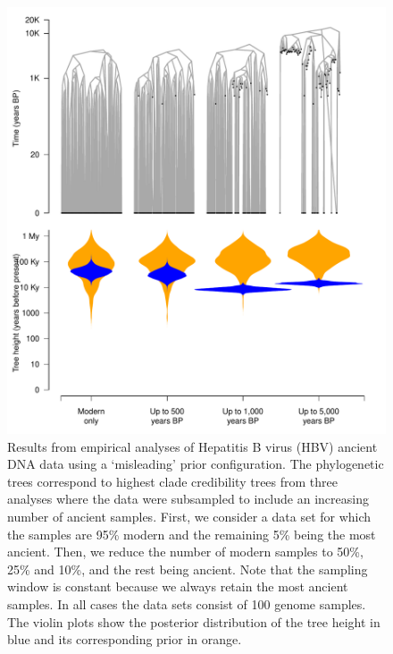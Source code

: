 \documentclass[11pt]{article}
\begin{document}
\begin{figure}[H]
    \begin{center}
        \includegraphics[scale=0.7, angle=0]{empirical_results_depth_misleading_prior_tree_height.pdf}
        \caption{Results from empirical analyses of Hepatitis B virus (HBV) ancient DNA data using a `misleading' prior configuration. The phylogenetic trees correspond to highest clade credibility trees from three analyses where the data were subsampled to include an increasing number of ancient samples. First, we consider a data set for which the samples are 95\% modern and the remaining 5\% being the most ancient. Then, we reduce the number of modern samples to 50\%, 25\% and 10\%, and the rest being ancient. Note that the sampling window is constant because we always retain the most ancient samples. In all cases the data sets consist of 100 genome samples. The violin plots show the posterior distribution of the tree height in blue and its corresponding prior in orange.}
        \label{figure:Fig4}
    \end{center}
\end{figure}
\end{document}

